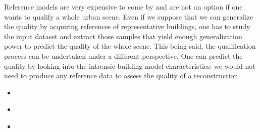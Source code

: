 \documentclass[../main.tex]{subfiles}
\begin{document}
    Reference models are very expensive to come by and are not an option if one wants to qualify a whole urban scene. Even if we suppose that we can generalize the quality by acquiring references of representative buildings, one has to study the input dataset and extract those samples that yield enough generalization power to predict the quality of the whole scene. This being said, the qualification process can be undertaken under a different perspective. One can predict the quality by looking into the intrensic building model characteristics: we would not need to produce any reference data to assess the quality of a reconstruction.
    \begin{itemize}
        \item ~\cite{OudeElberink2010}
        \item ~\cite{Boudet2006}
        \item ~\cite{michelin2013quality}
    \end{itemize}
\end{document}
